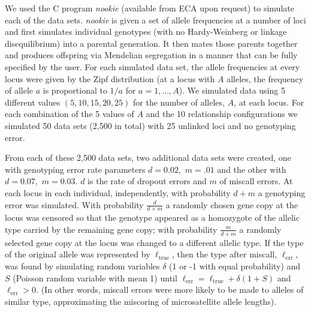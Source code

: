\documentclass[11pt]{article}
\begin{document}
We used the C program {\em nookie} (available from ECA upon request) to simulate each of the data sets.  
{\em nookie} is given a set of allele frequencies at a number of loci and first simulates individual 
genotypes (with no Hardy-Weinberg or linkage disequilibrium) into a parental generation.  It then mates 
those parents together and produces offspring via Mendelian segregation in a manner that can be fully 
specified by the user.  For each simulated data set, the allele frequencies at every locus were given 
by the Zipf distribution (at a locus with $A$ alleles, the frequency of allele $a$ is proportional to 
$1/a$ for $a=1,\ldots,A$). We simulated data using 5 different values $(5,10,15,20,25)$ for the number 
of alleles, $A$, at each locus. For each combination of the 5 values of $A$ and the 10 relationship 
configurations we simulated 50 data sets (2,500 in total)  with 25 unlinked loci and no genotyping 
error.  

From each of these 2,500 data sets, two additional data sets were created, one with genotyping error 
rate parameters $d=0.02$,~$m=.01$ and the other with $d=0.07$,~$m=0.03$.  $d$ is the rate of dropout 
errors and $m$ of miscall errors.  At each locus in each individual, independently, with probability $d
+m$ a genotyping error was simulated. With probability $\frac{d}{d+m}$ a randomly chosen gene copy at 
the locus was censored so that the genotype appeared as a homozygote of the allelic type carried by the 
remaining gene copy; with probability $\frac{m}{d+m}$ a randomly selected gene copy at the locus was 
changed to a different allelic type.  If the type of the original allele was represented by $\ell_
\mathrm{true}$, then the type after miscall, $\ell_\mathrm{err}$, was found by simulating random 
variables $\delta$ (1 or -1 with equal probability) and $S$ (Poisson random variable with mean 1) until 
$\ell_\mathrm{err} = \ell_\mathrm{true}+\delta(1+S)$ and $\ell_\mathrm{err}>0$. (In other words, 
miscall errors were more likely to be made to alleles of similar type, approximating the miscoring of 
microsatellite allele lengths).  
\end{document}
